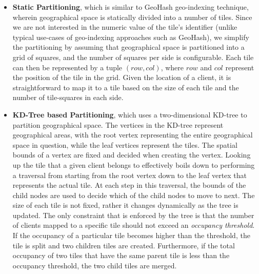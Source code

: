 \begin{itemize}
\item \textbf{Static Partitioning}, which is similar to GeoHash geo-indexing technique, wherein geographical space is statically divided into a number of tiles. Since we are not interested in the numeric value of the tile's identifier (unlike typical use-cases of geo-indexing approaches such as GeoHash), we simplify the partitioning by assuming that geographical space is partitioned into a grid of squares, and the number of squares per side is configurable. Each tile can then be represented by a tuple $\left( row, col \right)$, where $row$ and $col$ represent the position of the tile in the grid. Given the location of a client, it is straightforward to map it to a tile based on the size of each tile and the number of tile-squares in each side.
\item \textbf{KD-Tree based Partitioning}, which uses a two-dimensional KD-tree to partition geographical space. The vertices in the KD-tree represent geographical areas, with the root vertex representing the entire geographical space in question, while the leaf vertices represent the tiles. The spatial bounds of a vertex are fixed and decided when creating the vertex. Looking up the tile that a given client belongs to effectively boils down to performing a traversal from starting from the root vertex down to the leaf vertex that represents the actual tile. At each step in this traversal, the bounds of the child nodes are used to decide which of the child nodes to move to next. The size of each tile is not fixed, rather it changes dynamically as the tree is updated. The only constraint that is enforced by the tree is that the number of clients mapped to a specific tile should not exceed an \textit{occupancy threshold}. If the occupancy of a particular tile becomes higher than the threshold, the tile is split and two children tiles are created. Furthermore, if the total occupancy of two tiles that have the same parent tile is less than the occupancy threshold, the two child tiles are merged.
\end{itemize}

